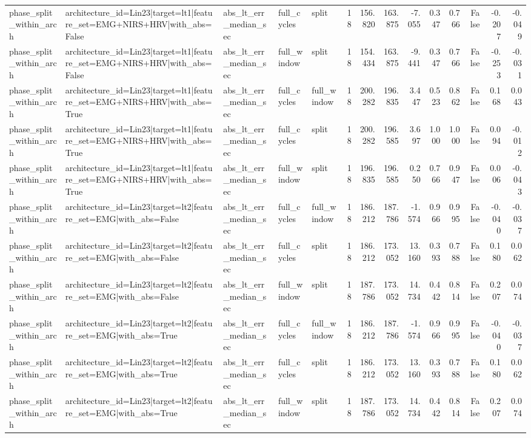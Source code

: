 \begin{table}
\begin{tabular}{lllllrrrrrrrrr}
phase_split_within_arch & architecture_id=Lin23|target=lt1|feature_set=EMG+NIRS+HRV|with_abs=False & abs_lt_err_median_sec & full_cycles & split & 18 & 156.820 & 163.875 & -7.055 & 0.347 & 0.766 & False & -0.207 & -0.049 \\
phase_split_within_arch & architecture_id=Lin23|target=lt1|feature_set=EMG+NIRS+HRV|with_abs=False & abs_lt_err_median_sec & full_window & split & 18 & 154.434 & 163.875 & -9.441 & 0.347 & 0.766 & False & -0.253 & -0.031 \\
phase_split_within_arch & architecture_id=Lin23|target=lt1|feature_set=EMG+NIRS+HRV|with_abs=True & abs_lt_err_median_sec & full_cycles & full_window & 18 & 200.282 & 196.835 & 3.447 & 0.523 & 0.862 & False & 0.168 & 0.043 \\
phase_split_within_arch & architecture_id=Lin23|target=lt1|feature_set=EMG+NIRS+HRV|with_abs=True & abs_lt_err_median_sec & full_cycles & split & 18 & 200.282 & 196.585 & 3.697 & 1.000 & 1.000 & False & 0.094 & -0.012 \\
phase_split_within_arch & architecture_id=Lin23|target=lt1|feature_set=EMG+NIRS+HRV|with_abs=True & abs_lt_err_median_sec & full_window & split & 18 & 196.835 & 196.585 & 0.250 & 0.766 & 0.947 & False & 0.006 & -0.043 \\
phase_split_within_arch & architecture_id=Lin23|target=lt2|feature_set=EMG|with_abs=False & abs_lt_err_median_sec & full_cycles & full_window & 18 & 186.212 & 187.786 & -1.574 & 0.966 & 0.995 & False & -0.040 & -0.037 \\
phase_split_within_arch & architecture_id=Lin23|target=lt2|feature_set=EMG|with_abs=False & abs_lt_err_median_sec & full_cycles & split & 18 & 186.212 & 173.052 & 13.160 & 0.393 & 0.788 & False & 0.180 & 0.062 \\
phase_split_within_arch & architecture_id=Lin23|target=lt2|feature_set=EMG|with_abs=False & abs_lt_err_median_sec & full_window & split & 18 & 187.786 & 173.052 & 14.734 & 0.442 & 0.814 & False & 0.207 & 0.074 \\
phase_split_within_arch & architecture_id=Lin23|target=lt2|feature_set=EMG|with_abs=True & abs_lt_err_median_sec & full_cycles & full_window & 18 & 186.212 & 187.786 & -1.574 & 0.966 & 0.995 & False & -0.040 & -0.037 \\
phase_split_within_arch & architecture_id=Lin23|target=lt2|feature_set=EMG|with_abs=True & abs_lt_err_median_sec & full_cycles & split & 18 & 186.212 & 173.052 & 13.160 & 0.393 & 0.788 & False & 0.180 & 0.062 \\
phase_split_within_arch & architecture_id=Lin23|target=lt2|feature_set=EMG|with_abs=True & abs_lt_err_median_sec & full_window & split & 18 & 187.786 & 173.052 & 14.734 & 0.442 & 0.814 & False & 0.207 & 0.074 \\

\end{tabular}
\end{table}
